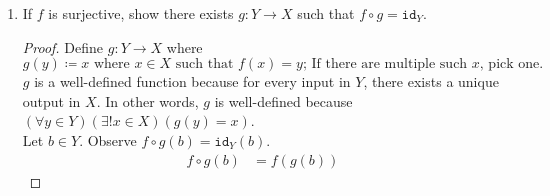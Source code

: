 \documentclass{article}
\newcommand{\defeq}{\coloneqq}
\newcommand{\id}{\texttt{id}}
\begin{document}
\begin{enumerate}
\begin{enumerate}
        If $f$ is injective, show there exists $g: Y \to X$ such that $g \circ f = \id_X$.
        \begin{proof}
            Let $x \in X$ and define $g: Y \to X$ where 
                \[
                g(y) = 
                \begin{cases}
                    a & \text{if } (\exists a \in X)(f(a)=y)\\
                    x & \text{otherwise}
                \end{cases}
                \]
            Since $f$ is injective, for any $a,b \in X$, if $f(b)=f(a)$, $b=a$. As such, for each input into g, if there is an $a$ that satisfies the first predicate, there is only one output. Evidently, for any other input, there is only one output and that output is $x$. Thus, g is a well-defined function.
            Now, Let $c \in X$ and observe that $g \circ f(c)= \id_X(c)$.
            \begin{align*}
            g \circ f(c)
              & = g(f(c))
                &\quad
                &\text{By definition of } g \circ f(x)\\
              & = c
                &\quad
                &\text{By definition of } g(x)\\
            & = \id_X(c)
                &\quad
                &\text{By definition of } \id\\
            \end{align*}
            Consequently, since $c$ was arbitrary, $g \circ f= \id_X$.
        \end{proof}
      \item
        If $f$ is surjective, show there exists $g: Y \to X$ such that $f \circ g = \id_Y$.
        \begin{proof}
            Define $g: Y \to X$ where 
            \begin{equation*}
                g(y) \defeq x \text{ where } x \in X \text{ such that } f(x)=y\text{; If there are multiple such $x$, pick one.}
            \end{equation*}
            $g$ is a well-defined function because for every input in $Y$, there exists a unique output in $X$. In other words, $g$ is well-defined because $(\forall y \in Y)(\exists!x \in X)(g(y)=x)$.\\
            Let $b \in Y$. Observe $f \circ g(b)= \id_Y(b)$.
            \begin{align*}
            f \circ g(b)
              & = f(g(b))

\end{align*}
\end{proof}
\end{enumerate}
\end{enumerate}
\end{document}
